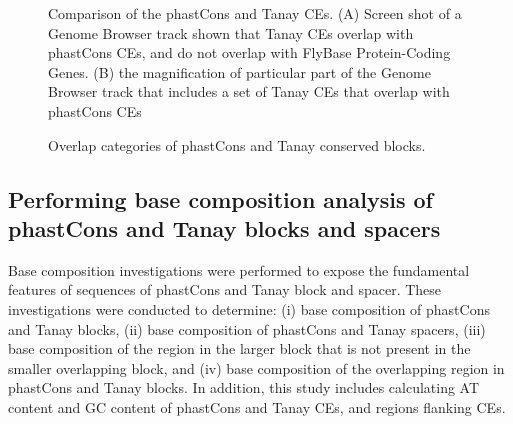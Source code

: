 \documentclass[12pt]{report}
\begin{document}
\begin{figure}[htbp]
\centering
{}
\caption[Caption for LOF]{Comparison of the phastCons and Tanay CEs. (A) Screen shot of a Genome Browser track shown that Tanay CEs overlap with phastCons CEs, and do not overlap with FlyBase Protein-Coding Genes. (B) the magnification of particular part of the Genome Browser track that includes a set of Tanay CEs that overlap with phastCons CEs}
\label{fig:tanay_phastCons}
\end{figure}

\begin{figure}[htbp]
\centering
{}
\caption{Overlap categories of phastCons and Tanay conserved blocks.}
\label{fig:T_P15_overlap}
\end{figure}

\subsection{Performing base composition analysis of phastCons and Tanay blocks and spacers}
Base composition investigations were performed to expose the fundamental features of sequences of phastCons and Tanay block and spacer. These investigations were conducted to determine: (i) base composition of phastCons and Tanay blocks, (ii) base composition of phastCons and Tanay spacers, (iii) base composition of the region in the larger block that is not present in the smaller overlapping block, and (iv) base composition of the overlapping region in phastCons and Tanay blocks. In addition, this study includes calculating AT content and GC content of phastCons and Tanay CEs, and regions flanking CEs.
\end{document}
